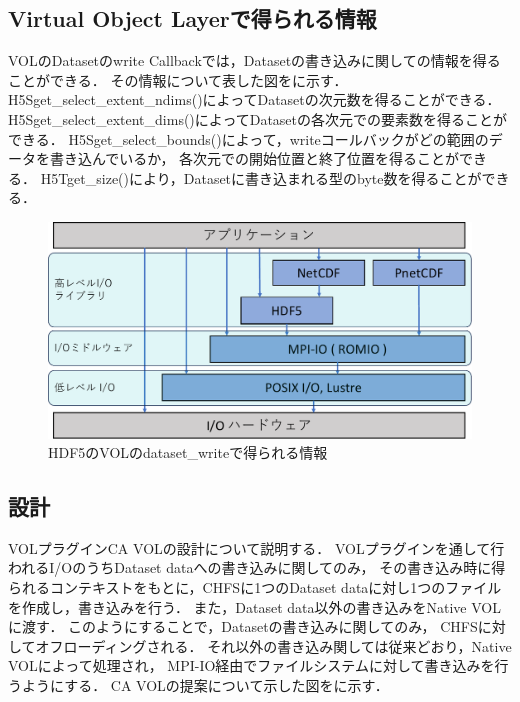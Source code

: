 \documentclass[submit,techrep,noauthor]{ipsj}
\begin{document}
\subsection{Virtual Object Layerで得られる情報}
VOLのDatasetのwrite Callbackでは，Datasetの書き込みに関しての情報を得ることができる．
その情報について表した図をに示す．
H5Sget\_select\_extent\_ndims()によってDatasetの次元数を得ることができる．
H5Sget\_select\_extent\_dims()によってDatasetの各次元での要素数を得ることができる．
H5Sget\_select\_bounds()によって，writeコールバックがどの範囲のデータを書き込んでいるか，
各次元での開始位置と終了位置を得ることができる．
H5Tget\_size()により，Datasetに書き込まれる型のbyte数を得ることができる．

\begin{figure}[t]
	\centering
	\includegraphics[page=16,width=\linewidth]{figure-crop.pdf}
	\caption{HDF5のVOLのdataset\_writeで得られる情報}
	\label{fig:hdf5infoinvol}
\end{figure}


\subsection{設計}
VOLプラグインCA VOLの設計について説明する．
VOLプラグインを通して行われるI/OのうちDataset dataへの書き込みに関してのみ，
その書き込み時に得られるコンテキストをもとに，CHFSに1つのDataset dataに対し1つのファイルを作成し，書き込みを行う．
また，Dataset data以外の書き込みをNative VOLに渡す．
このようにすることで，Datasetの書き込みに関してのみ，
CHFSに対してオフローディングされる．
それ以外の書き込み関しては従来どおり，Native VOLによって処理され，
MPI-IO経由でファイルシステムに対して書き込みを行うようにする．
CA VOLの提案について示した図をに示す．
\end{document}
